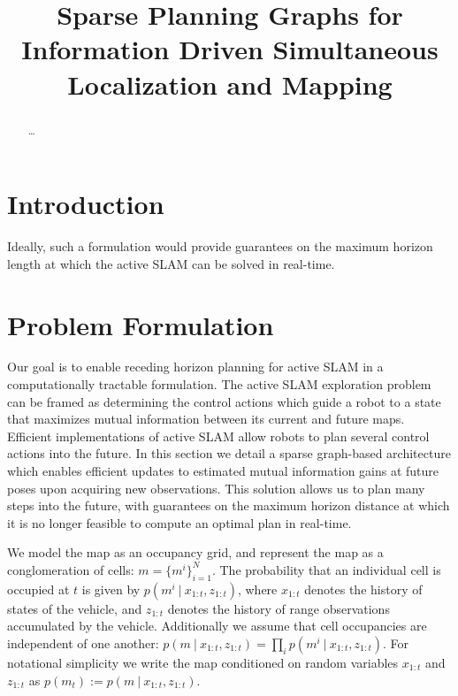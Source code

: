 \documentclass[conference]{IEEEtran}
\begin{document}
\title{Sparse Planning Graphs for Information Driven Simultaneous Localization and Mapping}
\author{
}

\maketitle

\begin{abstract}
\boldmath
\dots
\end{abstract}

\IEEEpeerreviewmaketitle

\section{Introduction}

Ideally, such a formulation would provide guarantees on the maximum horizon length at which the active SLAM can be solved in real-time.

\section{Problem Formulation}

Our goal is to enable receding horizon planning for active SLAM in a computationally tractable formulation. The active SLAM exploration problem can be framed as determining the control actions which guide a robot to a state that maximizes mutual information between its current and future maps. Efficient implementations of active SLAM allow robots to plan several control actions into the future. In this section we detail a sparse graph-based architecture which enables efficient updates to estimated mutual information gains at future poses upon acquiring new observations. This solution allows us to plan many steps into the future, with guarantees on the maximum horizon distance at which it is no longer feasible to compute an optimal plan in real-time.

We model the map as an occupancy grid, and represent the map as a conglomeration of cells: $m = \{m^{i}\}_{i=1}^{N}$. The probability that an individual cell is occupied at $t$ is given by $p\left(m^{i} \ \vert \ x_{1:t}, z_{1:t}\right)$, where $x_{1:t}$ denotes the history of states of the vehicle, and $z_{1:t}$ denotes the history of range observations accumulated by the vehicle. Additionally we assume that cell occupancies  are independent of one another: $p\left(m \ \vert \ x_{1:t}, z_{1:t}\right) = \prod_{i} p\left(m^{i} \ \vert \ x_{1:t}, z_{1:t}\right)$. For notational simplicity we write the map conditioned on random variables $x_{1:t}$ and $z_{1:t}$ as $p\left(m_{t}\right) := p\left(m \ \vert \ x_{1:t}, z_{1:t}\right)$.
\end{document}
